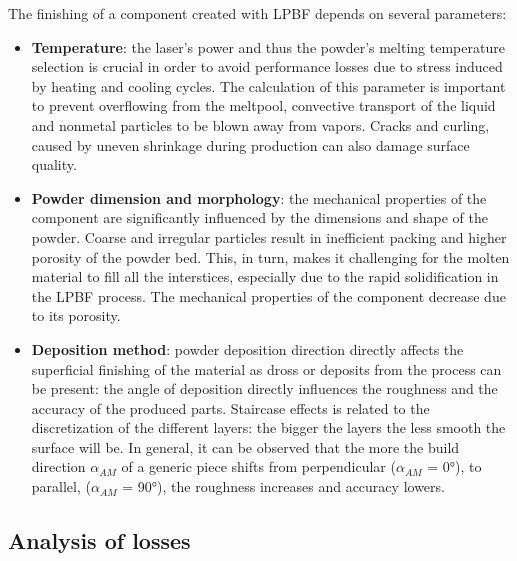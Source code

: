 The finishing of a component created with LPBF depends on several parameters: 

\begin{itemize}
    \item \textbf{Temperature}: the laser's power and thus the powder's melting temperature selection is crucial in order to avoid performance losses due to stress induced by heating and cooling cycles. The calculation of this parameter is important to prevent overflowing from the meltpool, convective transport of the liquid and nonmetal particles to be blown away from vapors. Cracks and curling, caused by uneven shrinkage during production can also damage surface quality\cite{lpbf_accuracy}. 
    \item  \textbf{Powder dimension and morphology}: the mechanical properties of the component are significantly influenced by the dimensions and shape of the powder. Coarse and irregular particles result in inefficient packing and higher porosity of the powder bed. This, in turn, makes it challenging for the molten material to fill all the interstices, especially due to the rapid solidification in the LPBF process. The mechanical properties of the component decrease due to its porosity\cite{dimension_powder}.
    \item  \textbf{Deposition method}: powder deposition direction directly affects the superficial finishing of the material as dross or deposits from the process can be present: the angle of deposition directly influences the roughness and the accuracy of the produced parts. Staircase effects is related to the discretization of the different layers: the bigger the layers the less smooth the surface will be. In general, it can be observed that the more the build direction $\alpha_{AM}$ of a generic piece shifts from perpendicular ($\alpha_{AM}$ = 0°), to parallel, ($\alpha_{AM}$ = 90°), the roughness increases and accuracy lowers\cite{tesi_dottorato}.
\end{itemize}


\subsection{Analysis of losses}
\label{subsec:losses_intro}

